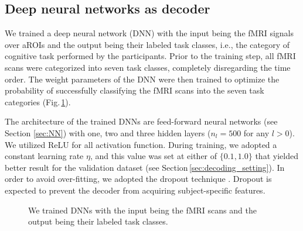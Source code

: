 
\subsection{Deep neural networks as decoder}
\label{sec:dnn_as_decoder}
We trained a deep neural network (DNN) with the input being the fMRI
signals over aROIs and the output being their labeled task classes,
i.e., the category of cognitive task performed by the participants.
%
Prior to the training step, all fMRI scans were categorized into seven
task classes, completely disregarding the time order. The weight
parameters of the DNN were then trained to optimize the probability of
successfully classifying the fMRI scans into the seven task categories
(Fig.\,\ref{fig:dnn}).

The architecture of the trained DNNs are feed-forward neural networks
(see Section \ref{sec:NN}) with one, two and three hidden layers ($n_l = 500$ for any
$l > 0$).
We utilized ReLU for all activation function.
During training,  we adopted a constant learning rate $\eta$, and this
value was set at either of $\{0.1, 1.0\}$ that yielded better result for
the validation dataset (see Section\,\ref{sec:decoding_setting}).
In order to avoid over-fitting, we adopted the dropout technique \cite{Hinton2012}.
Dropout is expected to prevent the decoder from acquiring subject-specific features.
%
\begin{figure}[thpb]
 \begin{center}
  \caption{\label{fig:dnn}
  We trained DNNs with the input being the fMRI scans and the output being their labeled task classes.}
 \end{center}
\end{figure}
%

